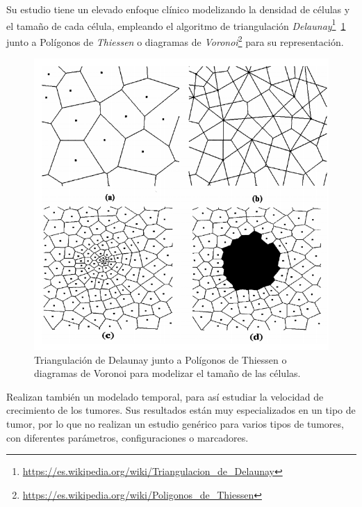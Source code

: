Su estudio tiene un elevado enfoque clínico modelizando la densidad de células y
el tamaño de cada célula, empleando el algoritmo de triangulación \textit{Delaunay}\footnote{\url{https://es.wikipedia.org/wiki/Triangulacion_de_Delaunay}}~\ref{fig:delaunay}
junto a Polígonos de \textit{Thiessen} o diagramas de \textit{Voronoi}\footnote{\url{https://es.wikipedia.org/wiki/Poligonos_de_Thiessen}} para su representación.

\begin{figure}[h]
\centering
\includegraphics[scale=0.7]{figures/modelado_tamanio}
\caption{Triangulación de Delaunay junto a Polígonos de Thiessen o diagramas de Voronoi para modelizar el tamaño de las células.}
\label{fig:delaunay}
\end{figure}

Realizan también un modelado temporal, para así estudiar la velocidad de crecimiento de los tumores.
Sus resultados están muy especializados en un tipo de tumor, por lo que no realizan un estudio genérico
para varios tipos de tumores, con diferentes parámetros, configuraciones o marcadores.

